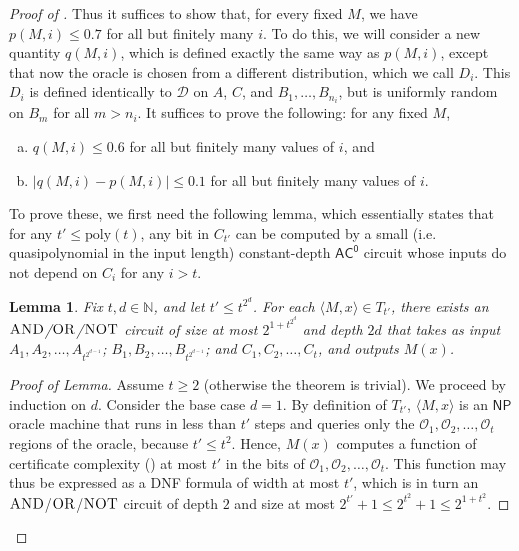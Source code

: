 \documentclass[11pt]{article}%
\newtheorem{lemma}[theorem]{Lemma}
\newcommand{\Naturals}{\mathbb{N}}
\newcommand{\poly}{\mathrm{poly}}
\newcommand{\AND}{\normalfont\textsc{AND}} %
\newcommand{\OR}{\normalfont\textsc{OR}}
\newcommand{\NOT}{\normalfont\textsc{NOT}}
\begin{document}
\begin{proof}[Proof of ]
\noindent Thus it suffices to show that, for every fixed $M$, we have $p(M,i)\leq 0.7$ for all but finitely many $i$. To do this, we will consider a new quantity $q(M,i)$, which is defined exactly the same way as $p(M,i)$, except that now the oracle is chosen from a different distribution, which we call $D_i$. This $D_i$ is defined identically to $\mathcal{D}$ on $A$, $C$, and $B_1, \ldots, B_{n_i}$, but is uniformly random on $B_m$ for all $m > n_i$. It suffices to prove the following: for any fixed $M$,
\begin{enumerate}[(a)]
    \item $q(M,i)\leq 0.6$ for all but finitely many values of $i$, and
    \item $|q(M,i)-p(M,i)|\leq 0.1$ for all but finitely many values of $i$.
\end{enumerate}

To prove these, we first need the following lemma, which essentially states that for any $t' \le \poly(t)$, any bit in $C_{t'}$ can be computed by a small (i.e. quasipolynomial in the input length) constant-depth $\mathsf{AC^0}$ circuit whose inputs do not depend on $C_i$ for any $i > t$.

\begin{lemma}
\label{lem:recursive_np_ac0}
Fix $t, d \in \Naturals$, and let $t' \le t^{2^d}$. For each $\langle M, x \rangle \in T_{t'}$, there exists an $\AND$/$\OR$/$\NOT$ circuit of size at most $2^{1 + t^{2^d}}$ and depth $2d$ that takes as input $A_1,A_2,\ldots,A_{t^{2^{d-1}}}$; $B_1,B_2,\ldots,B_{t^{2^{d-1}}}$; and $C_1,C_2,\ldots,C_{t}$, and outputs $M(x)$.
\end{lemma}

\begin{proof}[Proof of Lemma]
Assume $t \ge 2$ (otherwise the theorem is trivial). We proceed by induction on $d$. Consider the base case $d = 1$. By definition of $T_{t'}$, $\langle M, x \rangle$ is an $\mathsf{NP}$ oracle machine that runs in less than $t'$ steps and queries only the $\mathcal{O}_1,\mathcal{O}_2,\ldots,\mathcal{O}_{t}$ regions of the oracle, because $t' \le t^2$. Hence, $M(x)$ computes a function of certificate complexity () at most $t'$ in the bits of $\mathcal{O}_1,\mathcal{O}_2,\ldots,\mathcal{O}_{t}$. This function may thus be expressed as a DNF formula of width at most $t'$, which is in turn an $\AND$/$\OR$/$\NOT$ circuit of depth $2$ and size at most $2^{t'} + 1 \le 2^{t^2} + 1 \le 2^{1 + t^2}$.


\end{proof}
\end{proof}
\end{document}
